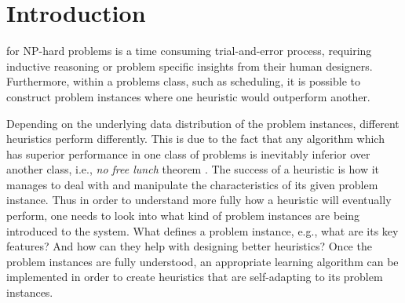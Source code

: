 

\chapter{Introduction}\label{ch:introduction} 

 for NP-hard problems is a time consuming trial-and-error process, requiring inductive reasoning or problem specific insights from their human designers. Furthermore, within a problems class, such as scheduling, it is possible to construct problem instances where one heuristic would outperform another. 

Depending on the underlying data distribution of the problem instances, different heuristics perform differently. This is due to the fact that any algorithm which has superior performance in one class of problems is inevitably inferior over another class, i.e., \emph{no free lunch} theorem \citep{Wolpert97nofree}. 
The success of a heuristic is how it manages to deal with and manipulate the characteristics of its given problem instance. Thus in order to understand more fully how a heuristic will eventually perform, one needs to look into what kind of problem instances are being introduced to the system. What defines a problem instance, e.g., what are its key features? And how can they help with designing better heuristics? Once the problem instances are fully understood, an appropriate learning algorithm can be implemented in order to create heuristics that are  self-adapting to its problem instances.

